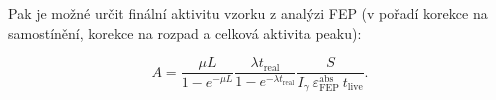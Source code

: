 Pak je možné určit finální aktivitu vzorku z analýzi FEP (v pořadí korekce na samostínění, korekce na rozpad a celková aktivita peaku):

$$ \boxed{ A = \dfrac{\mu L}{1 - e^{-\mu L}} \dfrac{\lambda t_\text{real}}{1 - e^{- \lambda t_\text{real}}} \dfrac{S}{I_\gamma \: \varepsilon_\text{FEP}^\text{abs} \: {t_\text{live}}}.} $$

